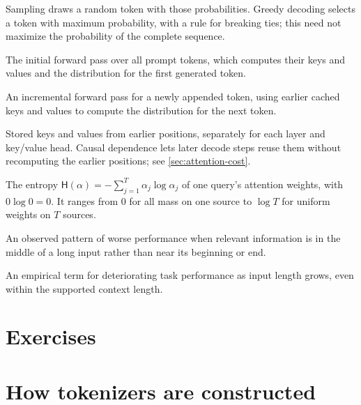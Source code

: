 \documentclass[11pt,twoside]{article}
\newcommand{\Hent}{\mathsf H}
\theoremstyle{plain}
\theoremstyle{definition}
\theoremstyle{remark}
\renewcommand{\thesection}{1.\arabic{section}}
\begin{document}
\begin{description}[style=nextline,leftmargin=1.5em,labelindent=0pt]
Sampling draws a random token with those probabilities. Greedy decoding
selects a token with maximum probability, with a rule for breaking ties;
this need not maximize the probability of the complete sequence.
\item[Prefill]
The initial forward pass over all prompt tokens, which computes their keys
and values and the distribution for the first generated token.
\item[Decode step]
An incremental forward pass for a newly appended token, using earlier cached
keys and values to compute the distribution for the next token.
\item[KV cache]
Stored keys and values from earlier positions, separately for each layer
and key/value head. Causal dependence lets later decode steps reuse them
without recomputing the earlier positions; see \cref{sec:attention-cost}.
\item[Attention entropy]
The entropy $\Hent(\alpha)=-\sum_{j=1}^T\alpha_j\log\alpha_j$ of one
query's attention weights, with $0\log0=0$. It ranges from $0$ for all mass
on one source to $\log T$ for uniform weights on $T$ sources.
\item[Lost in the middle]
An observed pattern of worse performance when relevant information is in
the middle of a long input rather than near its beginning or end.
\item[Context rot]
An empirical term for deteriorating task performance as input length grows,
even within the supported context length.
\end{description}

\section{Exercises}

\exerciseinstructions
\setcounter{courseexercise}{0}








\clearpage
\appendix
\renewcommand{\thesection}{\Alph{section}}
\section{How tokenizers are constructed}
\label{app:tokenizer-construction}
\end{document}
